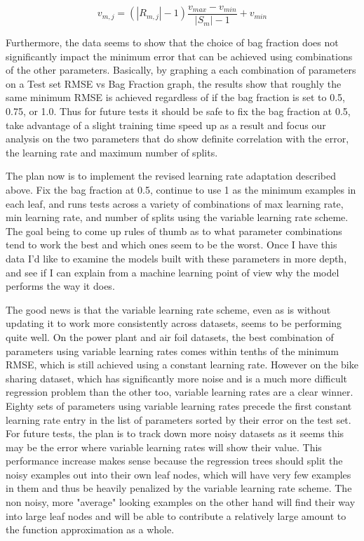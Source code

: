 \documentclass[runningheads]{llncs_2}
\begin{document}
\begin{equation}
v_{m,j} =(|R_{m,j}| - 1)\frac{v_{max} - v_{min}} {|S_m| - 1} + v_{min}
\label{eq:adaptRule2}
\end{equation}

Furthermore, the data seems to show that the choice of bag fraction does not significantly impact the minimum error that can be achieved using combinations of the other parameters. Basically, by graphing a each combination of parameters on a Test set RMSE vs Bag Fraction graph, the results show that roughly the same minimum RMSE is achieved regardless of if the bag fraction is set to 0.5, 0.75, or 1.0. Thus for future tests it should be safe to fix the bag fraction at 0.5, take advantage of a slight training time speed up as a result and focus our analysis on the two parameters that do show definite correlation with the error, the learning rate and maximum number of splits.

The plan now is to implement the revised learning rate adaptation described above. Fix the bag fraction at 0.5, continue to use 1 as the minimum examples in each leaf, and runs tests across a variety of combinations of max learning rate, min learning rate, and number of splits using the variable learning rate scheme. The goal being to come up rules of thumb as to what parameter combinations tend to work the best and which ones seem to be the worst. Once I have this data I'd like to examine the models built with these parameters in more depth, and see if I can explain from a machine learning point of view why the model performs the way it does.

The good news is that the variable learning rate scheme, even as is without updating it to work more consistently across datasets, seems to be performing quite well. On the power plant and air foil datasets, the best combination of parameters using variable learning rates comes within tenths of the minimum RMSE, which is still achieved using a constant learning rate. However on the bike sharing dataset, which has significantly more noise and is a much more difficult regression problem than the other too, variable learning rates are a clear winner. Eighty sets of parameters using variable learning rates precede the first constant learning rate entry in the list of parameters sorted by their error on the test set. For future tests, the plan is to track down more noisy datasets as it seems this may be the error where variable learning rates will show their value. This performance increase makes sense because the regression trees should split the noisy examples out into their own leaf nodes, which will have very few examples in them and thus be heavily penalized by the variable learning rate scheme. The non noisy, more "average" looking examples on the other hand will find their way into large leaf nodes and will be able to contribute a relatively large amount to the function approximation as a whole.





\end{document}
